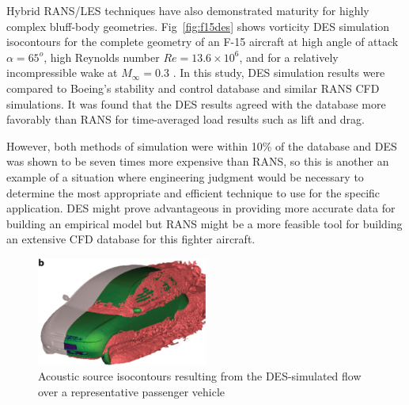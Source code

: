\documentclass[journal]{new-aiaa}
\begin{document}
Hybrid RANS/LES techniques have also demonstrated maturity for highly complex bluff-body geometries. Fig~\ref{fig:f15des} shows vorticity DES simulation isocontours for the complete geometry of an F-15 aircraft at high angle of attack $\alpha=65^o$, high Reynolds number $Re=13.6\times10^6$, and for a relatively incompressible wake at $M_{\infty}=0.3$ \cite{forsythe2004detachededdy}. In this study, DES simulation results were compared to Boeing’s stability and control database and similar RANS CFD simulations. It was found that the DES results agreed with the database more favorably than RANS for time-averaged load results such as lift and drag.

However, both methods of simulation were within 10\% of the database and DES was shown to be seven times more expensive than RANS, so this is another an example of a situation where engineering judgment would be necessary to determine the most appropriate and efficient technique to use for the specific application. DES might prove advantageous in providing more accurate data for building an empirical model but RANS might be a more feasible tool for building an extensive CFD database for this fighter aircraft.


\begin{figure}[H]
\begin{center}
\includegraphics[width=0.5\textwidth]{Images/logan/spalart2009detachededdy_carDES.pdf}
\caption{ Acoustic source isocontours resulting from the DES-simulated flow over a representative passenger vehicle \cite{mendonca2002towards} }
\label{fig:cardes}
\end{center}
\end{figure}
\end{document}
